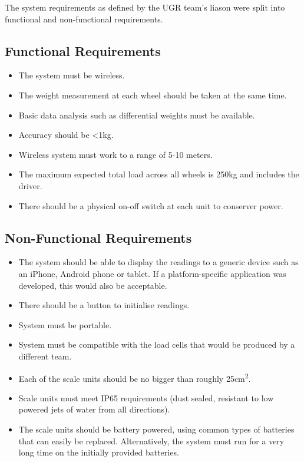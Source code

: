 The system requirements as defined by the UGR team's liason were split into functional and non-functional requirements.

\subsection{Functional Requirements}
\label{functional}
\begin{itemize}
\item The system must be wireless.
\item The weight measurement at each wheel should be taken at the same time.
\item Basic data analysis such as differential weights must be available.
\item Accuracy should be \textless 1kg.
\item Wireless system must work to a range of 5-10 meters.
\item The maximum expected total load across all wheels is 250kg and includes the driver.
\item There should be a physical on-off switch at each unit to conserver power.
\end{itemize}

\subsection{Non-Functional Requirements}
\label{non-functional}
\begin{itemize}
\item The system should be able to display the readings to a generic device such as an iPhone, Android phone or tablet. If a platform-specific application was developed, this would also be acceptable.
\item There should be a button to initialise readings.
\item System must be portable.
\item System must be compatible with the load cells that would be produced by a different team.
\item Each of the scale units should be no bigger than roughly 25cm\textsuperscript{2}.
\item Scale units must meet IP65 requirements (dust sealed, resistant to low powered jets of water from all directions).
\item The scale units should be battery powered, using common types of batteries that can easily be replaced. Alternatively, the system must run for a very long time on the initially provided batteries.
\end{itemize}
